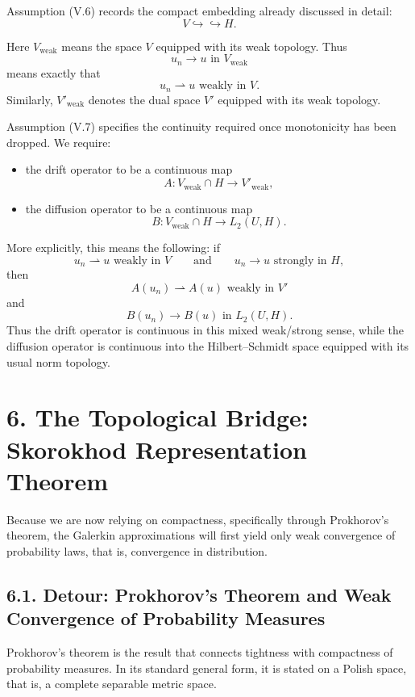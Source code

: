 \documentclass[11pt]{article}
\theoremstyle{definition}
\theoremstyle{remark}
\begin{document}
Assumption (V.6) records the compact embedding already discussed in detail:
\[
  V \hookrightarrow \hookrightarrow H.
\]

Here $V_{\mathrm{weak}}$ means the space $V$ equipped with its weak topology. Thus
\[
  u_n \to u \text{ in } V_{\mathrm{weak}}
\]
means exactly that
\[
  u_n \rightharpoonup u \text{ weakly in } V.
\]
Similarly, $V'_{\mathrm{weak}}$ denotes the dual space $V'$ equipped with its weak topology.

Assumption (V.7) specifies the continuity required once monotonicity has been dropped. We require:
\begin{itemize}
\item the drift operator to be a continuous map
\[
  A:V_{\mathrm{weak}}\cap H \to V'_{\mathrm{weak}},
\]
\item the diffusion operator to be a continuous map
\[
  B:V_{\mathrm{weak}}\cap H \to L_2(U,H).
\]
\end{itemize}

More explicitly, this means the following: if
\[
  u_n \rightharpoonup u \text{ weakly in } V
  \qquad \text{and} \qquad
  u_n \to u \text{ strongly in } H,
\]
then
\[
  A(u_n)\rightharpoonup A(u) \text{ weakly in } V'
\]
and
\[
  B(u_n)\to B(u) \text{ in } L_2(U,H).
\]
Thus the drift operator is continuous in this mixed weak/strong sense, while the diffusion operator is continuous into the Hilbert--Schmidt space equipped with its usual norm topology.

\section*{6. The Topological Bridge: Skorokhod Representation Theorem}
Because we are now relying on compactness, specifically through Prokhorov's theorem, the Galerkin approximations will first yield only weak convergence of probability laws, that is, convergence in distribution.

\subsection*{6.1. Detour: Prokhorov's Theorem and Weak Convergence of Probability Measures}
Prokhorov's theorem is the result that connects tightness with compactness of probability measures. In its standard general form, it is stated on a Polish space, that is, a complete separable metric space.
\end{document}
